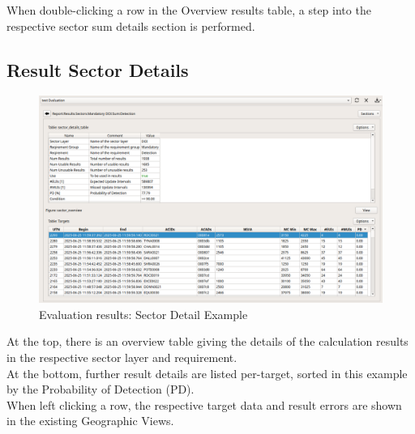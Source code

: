 When double-clicking a row in the Overview results table, a step into the respective sector sum details section is performed.

\subsection{Result Sector Details}

\begin{figure}[H]
  \hspace*{-2cm}
    \includegraphics[width=18cm,frame]{figures/eval_results_sec_det_example.png}
  \caption{Evaluation results: Sector Detail Example}
\end{figure}

At the top, there is an overview table giving the details of the calculation results in the respective sector layer and requirement. \\

At the bottom, further result details are listed per-target, sorted in this example by the Probability of Detection (PD). \\

When left clicking a row, the respective target data and result errors are shown in the existing Geographic Views.

